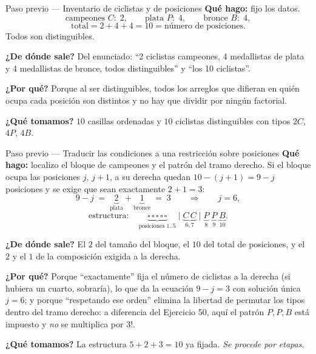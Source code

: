 \documentclass[11pt]{article}
\begin{document}
\begin{paso}{Paso previo --- Inventario de ciclistas y de posiciones}
\textbf{Qu\'e hago:} fijo los datos.
\[
\text{campeones }C:\;2,\qquad \text{plata }P:\;4,\qquad \text{bronce }B:\;4,
\]
\[
\text{total}=2+4+4=10=\text{n\'umero de posiciones}.
\]
Todos son distinguibles.

\textbf{¿De d\'onde sale?} Del enunciado: ``2 ciclistas campeones, 4 medallistas de plata y 4 medallistas de
bronce, todos distinguibles'' y ``los 10 ciclistas''.

\textbf{¿Por qu\'e?} Porque al ser distinguibles, todos los arreglos que difieran en qui\'en ocupa cada
posici\'on son distintos y no hay que dividir por ning\'un factorial.

\textbf{¿Qu\'e tomamos?} $10$ casillas ordenadas y $10$ ciclistas distinguibles con tipos $2C$, $4P$, $4B$.
\end{paso}

\begin{paso}{Paso previo --- Traducir las condiciones a una restricci\'on sobre posiciones}
\textbf{Qu\'e hago:} localizo el bloque de campeones y el patr\'on del tramo derecho. Si el bloque ocupa las
posiciones $j,\,j+1$, a su derecha quedan $10-(j+1)=9-j$ posiciones y se exige que sean exactamente
$2+1=3$:
\[
9-j\;=\;\underbrace{2}_{\text{plata}}+\underbrace{1}_{\text{bronce}}\;=\;3
\qquad\Longrightarrow\qquad j=6 ,
\]
\[
\text{estructura}:\quad \underbrace{\square\,\square\,\square\,\square\,\square}_{\text{posiciones }1..5}\;\big|\;\underbrace{C\,C}_{6,7}\;\big|\;\underbrace{P}_{8}\;\underbrace{P}_{9}\;\underbrace{B}_{10} .
\]

\textbf{¿De d\'onde sale?} El $2$ del tama\~no del bloque, el $10$ del total de posiciones, y el $2$ y el $1$
de la composici\'on exigida a la derecha.

\textbf{¿Por qu\'e?} Porque ``exactamente'' fija el n\'umero de ciclistas a la derecha (si hubiera un cuarto,
sobrar\'ia), lo que da la ecuaci\'on $9-j=3$ con soluci\'on \'unica $j=6$; y porque ``respetando ese orden''
elimina la libertad de permutar los tipos dentro del tramo derecho: a diferencia del Ejercicio 50, aqu\'i el
patr\'on $P,P,B$ est\'a impuesto y \emph{no} se multiplica por $3!$.

\textbf{¿Qu\'e tomamos?} La estructura $5+2+3=10$ ya fijada. \emph{Se procede por etapas.}
\end{paso}
\end{document}
